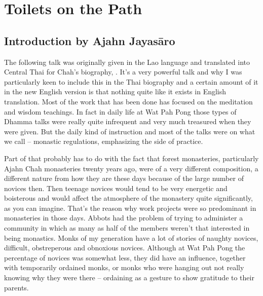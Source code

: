 
\chapter{Toilets on the Path}

\section{Introduction by Ajahn Jayas\=aro}

\begingroup\itshape

The following talk was originally given in the Lao language and translated into Central Thai for  Chah's biography, . It's a very powerful talk and why I was particularly keen to include this in the Thai biography and a certain amount of it in the new English version is that nothing quite like it exists in English translation. Most of the work that has been done has focused on the meditation and wisdom teachings. In fact in daily life at Wat Pah Pong those types of Dhamma talks were really quite infrequent and very much treasured when they were given. But the daily kind of instruction and most of the talks were on what we call  -- monastic regulations, emphasizing the  side of practice.

Part of that probably has to do with the fact that forest monasteries, particularly Ajahn Chah monasteries twenty years ago, were of a very different composition, a different nature from how they are these days because of the large number of novices then. Then teenage novices would tend to be very energetic and boisterous and would affect the atmosphere of the monastery quite significantly, as you can imagine. That's the reason why work projects were so predominant in monasteries in those days. Abbots had the problem of trying to administer a community in which as many as half of the members weren't that interested in being monastics. Monks of my generation have a lot of stories of naughty novices, difficult, obstreperous and obnoxious novices. Although at Wat Pah Pong the percentage of novices was somewhat less, they did have an influence, together with temporarily ordained monks, or monks who were hanging out not really knowing why they were there -- ordaining as a gesture to show gratitude to their parents.

